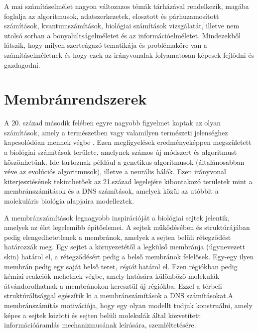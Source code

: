 

A mai számításelmélet nagyon változazos témák tárházával rendelkezik, 
magába foglalja az algoritmusok, adatszerkezetek, elosztott és párhuzamosított számítások, kvantumszámítások, biológiai számítások vizsgálatát, illetve nem utolsó sorban a bonyolultságelméletet és az információelméletet.
Mindezekből látszik, hogy milyen szerteágazó tematikája és problémaköre van a számításelméletnek és hogy ezek az irányvonalak folyamatosan képesek fejlődni és gazdagodni.

\section{Membránrendszerek}

A 20. század második felében egyre nagyobb figyelmet kaptak az olyan számítások, amely a természetben vagy valamilyen természeti jelenséghez kapcsolódóan mennek végbe \cite{paun2002membrane}. Ezen megfigyelések eredményeképpen megszületett a biológiai számítások területe, amelynek számos új módszert és algoritmust köszönhetünk. Ide tartoznak például a genetikus algoritmusok (általánosabban véve az evolúciós algoritmusok), illetve a neurális hálók. Ezen irányvonal kiterjesztésének tekinthetőek az 21.század legelejére kibontakozó területek mint a membránszámítások és a DNS számítások, amelyek közül az utóbbit a molekuláris biológia alapjaira modelleztek.

A membránszámítások legnagyobb inspirációját a biológiai sejtek jelentik, amelyek az élet legelemibb építőelemei. A sejtek működésében és struktúrájában pedig elengedhetetlenek a membránok, amelyek a sejten belüli rétegződést határozzák meg. Egy sejtet a környezetétől a legkülső membránja (úgynevezett skin) határol el, a rétegződésért pedig a belső membránok felelősek.  Egy-egy ilyen membrán pedig egy saját belső teret, \textit{régiót} határol el.
Ezen régiókban pedig kémiai reakciók mehetnek végbe, amely hatására különböző molekulák átvándorolhatnak a membránokon keresztül új régiókba. Ezzel a térbeli struktúráltsággal egészítik ki a membránszámítások a DNS számításokat.A  membránszámítás motivációja, hogy egy olyan modellt tudjuk konstruálni, amely képes a sejtek közötti és sejten belüli molekulák által közvetített információáramlás mechanizmusának leírására, szemléltetésére.

